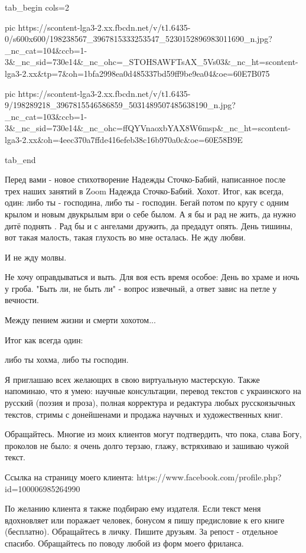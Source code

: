 \ifcmt
  tab_begin cols=2

     pic https://scontent-lga3-2.xx.fbcdn.net/v/t1.6435-0/s600x600/198238567_3967815333253547_5230152896983011690_n.jpg?_nc_cat=104&ccb=1-3&_nc_sid=730e14&_nc_ohc=_STOHSAWFTsAX_5Vs03&_nc_ht=scontent-lga3-2.xx&tp=7&oh=1bfa2998ea0d485337bd59ff9be9ea04&oe=60E7B075

     pic https://scontent-lga3-2.xx.fbcdn.net/v/t1.6435-9/198289218_3967815546586859_5031489507485638190_n.jpg?_nc_cat=103&ccb=1-3&_nc_sid=730e14&_nc_ohc=ffQYVnaoxbYAX8W6msp&_nc_ht=scontent-lga3-2.xx&oh=4eec370a7ffde416efeb38c16b970a0c&oe=60E58B9E

  tab_end
\fi

Перед вами - новое стихотворение Надежды Сточко-Бабий, написанное после трех наших занятий в Zoom
Надежда Сточко-Бабий. Хохот. 
Итог, как всегда, один: 
либо ты - господина, либо ты - господин.  
Бегай потом по кругу с одним крылом 
и новым двукрылым ври о себе былом.
А я бы и рад не жить, да нужно дитё поднять .
Рад бы и с ангелами дружить, да предадут опять.
День тишины, вот такая малость, 
такая глухость во мне осталась. 
Не жду любви. 

И не жду молвы. 

Не хочу оправдываться и выть.
Для  воя  есть время особое: 
День во храме и ночь у гроба.
"Быть ли, не быть ли" - вопрос извечный, 
а ответ завис на петле у вечности. 

Между пением  жизни и смерти хохотом...

Итог как всегда один: 

либо ты хохма, 
либо ты господин.

Я приглашаю всех желающих в свою виртуальную мастерскую. Также напоминаю, что я
умею: научные консультации, перевод текстов с украинского на русский (поэзия и
проза), полная корректура и редактура любых русскоязычных текстов, стримы с
донейшенами и продажа научных и художественных книг. 

Обращайтесь. Многие из моих клиентов могут подтвердить, что пока, слава Богу,
проколов не было: я очень долго терзаю, глажу, встряхиваю и зашиваю чужой
текст. 

Ссылка на страницу моего клиента: https://www.facebook.com/profile.php?id=100006985264990

По желанию клиента я также подбираю ему издателя. Если текст меня вдохновляет
или поражает человек, бонусом я пишу предисловие к его книге (бесплатно).
Обращайтесь в личку. Пишите друзьям. За репост - отдельное спасибо. Обращайтесь
по поводу любой из форм моего фриланса.

